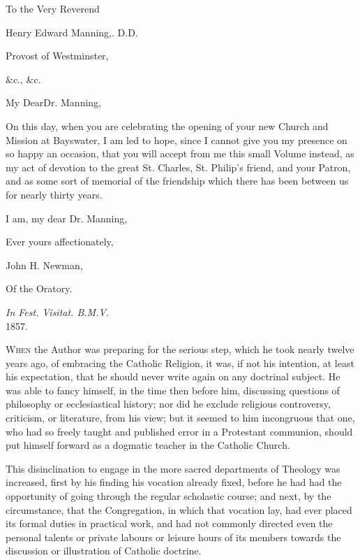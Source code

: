 



To the Very Reverend

Henry Edward Manning,. D.D.

Provost of Westminster,

\&c., \&c.


My Dear\textbf{}Dr. Manning,


On this day, when you are celebrating the opening of
your new Church and Mission at Bayswater, I am led to
hope, since I cannot give you my presence on so happy an
occasion, that you will accept from me this small Volume
instead, as my act of devotion to the great St. Charles,
St. Philip's friend, and your Patron, and as some sort of
memorial of the friendship which there has been between
us for nearly thirty years.


I am, my dear Dr. Manning,

Ever yours affectionately,

John H. Newman,

Of the Oratory.


\emph{In Fest. Visitat. B.M.V.}\\
1857.








W\textsc{hen} the Author was preparing
for the serious step, which he took nearly twelve years
ago, of embracing the Catholic Religion, it was, if not
his intention, at least his expectation, that he should
never write again on any doctrinal subject. He was able
to fancy himself, in the time then before him, discussing
questions of philosophy or ecclesiastical history; nor
did he exclude religious controversy, criticism, or
literature, from his view; but it seemed to him
incongruous that one, who had so freely taught and
published error in a Protestant communion, should put
himself forward as a dogmatic teacher in the Catholic
Church.


This disinclination to engage in
the more sacred departments of Theology was increased,
first by his finding his vocation already fixed, before
he had had the opportunity of going through the regular
scholastic course; and next, by the circumstance, that
the Congregation, in which that vocation lay, had ever
placed its formal duties in practical work, and had not
commonly directed even the personal talents or private
labours or leisure hours of its members towards the
discussion or illustration of Catholic doctrine.


